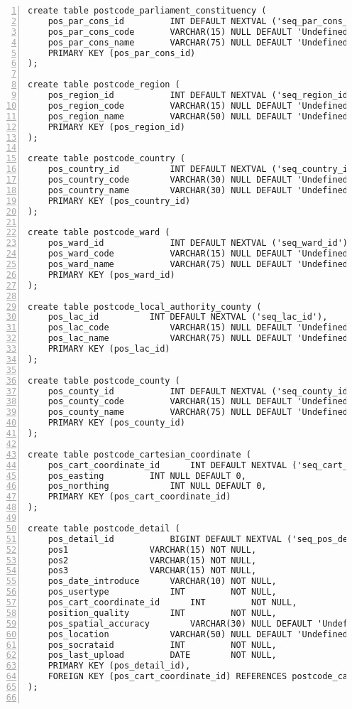 \begin{lstlisting}[breaklines, frame=single, numbers=left, caption={PL/pgSQL's DDL scripts for Postcode Normalized Table Creation.}, label=commandline-02]
create table postcode_parliament_constituency (
	pos_par_cons_id 		INT DEFAULT NEXTVAL ('seq_par_cons_id'), 
	pos_par_cons_code		VARCHAR(15) NULL DEFAULT 'Undefined',
	pos_par_cons_name		VARCHAR(75) NULL DEFAULT 'Undefined',
	PRIMARY KEY (pos_par_cons_id)
);

create table postcode_region (
	pos_region_id 			INT DEFAULT NEXTVAL ('seq_region_id'), 
	pos_region_code			VARCHAR(15) NULL DEFAULT 'Undefined',
	pos_region_name			VARCHAR(50) NULL DEFAULT 'Undefined',
	PRIMARY KEY (pos_region_id)
);

create table postcode_country ( 
	pos_country_id 			INT DEFAULT NEXTVAL ('seq_country_id'), 
	pos_country_code		VARCHAR(30) NULL DEFAULT 'Undefined',
	pos_country_name		VARCHAR(30) NULL DEFAULT 'Undefined',
	PRIMARY KEY (pos_country_id)
);

create table postcode_ward (
	pos_ward_id 			INT DEFAULT NEXTVAL ('seq_ward_id'), 
	pos_ward_code			VARCHAR(15) NULL DEFAULT 'Undefined',
	pos_ward_name			VARCHAR(75) NULL DEFAULT 'Undefined',
	PRIMARY KEY (pos_ward_id) 
); 

create table postcode_local_authority_county (
	pos_lac_id 			INT DEFAULT NEXTVAL ('seq_lac_id'), 
	pos_lac_code			VARCHAR(15) NULL DEFAULT 'Undefined',
	pos_lac_name			VARCHAR(75) NULL DEFAULT 'Undefined',
	PRIMARY KEY (pos_lac_id) 
); 

create table postcode_county (
	pos_county_id	 		INT DEFAULT NEXTVAL ('seq_county_id'), 
	pos_county_code			VARCHAR(15) NULL DEFAULT 'Undefined',
	pos_county_name			VARCHAR(75) NULL DEFAULT 'Undefined',
	PRIMARY KEY (pos_county_id) 
); 

create table postcode_cartesian_coordinate (
	pos_cart_coordinate_id	 	INT DEFAULT NEXTVAL ('seq_cart_coordinate_id'), 
	pos_easting			INT NULL DEFAULT 0,
	pos_northing			INT NULL DEFAULT 0,
	PRIMARY KEY (pos_cart_coordinate_id) 
); 

create table postcode_detail ( 
	pos_detail_id			BIGINT DEFAULT NEXTVAL ('seq_pos_detail_id'), 
	pos1				VARCHAR(15) NOT NULL, 
	pos2				VARCHAR(15) NOT NULL, 
	pos3				VARCHAR(15) NOT NULL, 
	pos_date_introduce		VARCHAR(10) NOT NULL,
	pos_usertype			INT  	    NOT NULL,
	pos_cart_coordinate_id		INT 	    NOT NULL,
	position_quality		INT         NOT NULL,
	pos_spatial_accuracy		VARCHAR(30) NULL DEFAULT 'Undefined',
	pos_location			VARCHAR(50) NULL DEFAULT 'Undefined',
	pos_socrataid			INT         NOT NULL,	
	pos_last_upload 		DATE 	    NOT NULL,
	PRIMARY KEY (pos_detail_id), 
	FOREIGN KEY (pos_cart_coordinate_id) REFERENCES postcode_cartesian_coordinate (pos_cart_coordinate_id)
);


\end{lstlisting}

